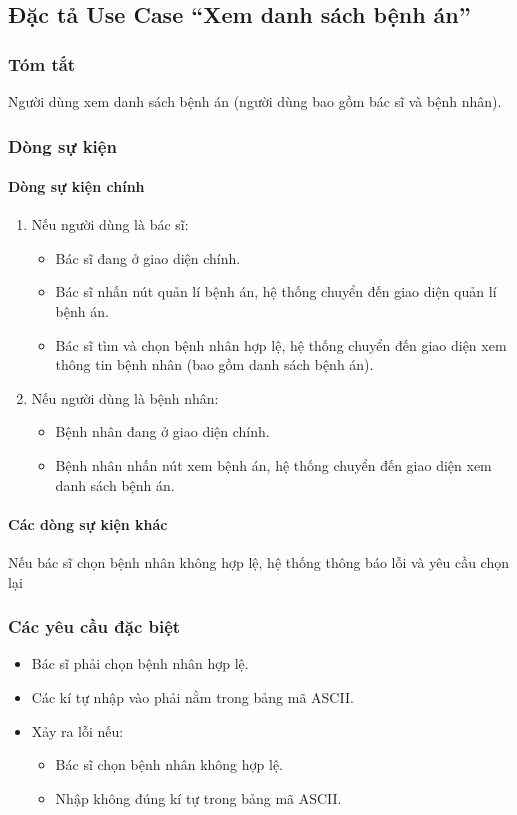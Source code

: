 \subsection{Đặc tả Use Case ``Xem danh sách bệnh án''}

\subsubsection{Tóm tắt}
Người dùng xem danh sách bệnh án (người dùng bao gồm bác sĩ và bệnh nhân).

\subsubsection{Dòng sự kiện}
\paragraph{\textbf{Dòng sự kiện chính}}
\begin{enumerate}
    \item Nếu người dùng là bác sĩ:
    \begin{itemize}
    \item Bác sĩ đang ở giao diện chính.
    \item Bác sĩ nhấn nút quản lí bệnh án, hệ thống chuyển đến giao diện quản lí bệnh án.
    \item Bác sĩ tìm và chọn bệnh nhân hợp lệ, hệ thống chuyển đến giao diện xem thông tin bệnh nhân (bao gồm danh sách bệnh án).
    \end{itemize}
    \item Nếu người dùng là bệnh nhân:
    \begin{itemize}
        \item Bệnh nhân đang ở giao diện chính.
        \item Bệnh nhân nhấn nút xem bệnh án, hệ thống chuyển đến giao diện xem danh sách bệnh án.
    \end{itemize}
\end{enumerate}

\paragraph{\textbf{Các dòng sự kiện khác}}
Nếu bác sĩ chọn bệnh nhân không hợp lệ, hệ thống thông báo lỗi và yêu cầu chọn lại

\subsubsection{Các yêu cầu đặc biệt}
\begin{itemize}
    \item Bác sĩ phải chọn bệnh nhân hợp lệ.
    \item Các kí tự nhập vào phải nằm trong bảng mã ASCII.
    \item Xảy ra lỗi nếu:
    \begin{itemize}
        \item Bác sĩ chọn bệnh nhân không hợp lệ.
        \item Nhập không đúng kí tự trong bảng mã ASCII.
    \end{itemize}
\end{itemize}


